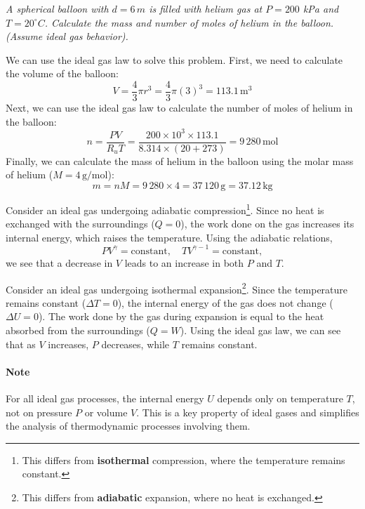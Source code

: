 \documentclass[11pt]{report}
\begin{document}
\begin{example}
    \textit{A spherical balloon with $d = 6\, m$ is filled with helium gas at $P = 200$ kPa and $T = 20^\circ C$. Calculate the mass and number of moles of helium in the balloon. (Assume ideal gas behavior).}

    We can use the ideal gas law to solve this problem. First, we need to calculate the volume of the balloon:
    $$        
    V = \frac{4}{3} \pi r^3 = \frac{4}{3} \pi (3)^3 = 113.1\, \text{m}^3
    $$
    Next, we can use the ideal gas law to calculate the number of moles of helium in the balloon:
    $$
        n = \frac{PV}{R_uT} = \frac{200 \times 10^3 \times 113.1}{8.314 \times (20 + 273)} = 9\,280\, \text{mol}
    $$
    Finally, we can calculate the mass of helium in the balloon using the molar mass of helium ($M = 4\, \text{g/mol}$):
    $$
        m = nM = 9\,280 \times 4  = 37\,120\, \text{g} = 37.12\, \text{kg}
    $$
\end{example}

\begin{example}
    Consider an ideal gas undergoing adiabatic compression\footnote{This differs from \textbf{isothermal} compression, where the temperature remains constant.}. 
    Since no heat is exchanged with the surroundings ($Q=0$), the work done on the gas increases its internal energy, which raises the temperature. 
    Using the adiabatic relations,
    $$
        P V^{\gamma} = \text{constant}, 
        \quad T V^{\gamma - 1} = \text{constant},
    $$
    we see that a decrease in $V$ leads to an increase in both $P$ and $T$.
\end{example}

\begin{example}
    Consider an ideal gas undergoing isothermal expansion\footnote{This differs from \textbf{adiabatic} expansion, where no heat is exchanged.}. 
    Since the temperature remains constant ($\Delta T = 0$), the internal energy of the gas does not change ($\Delta U = 0$). 
    The work done by the gas during expansion is equal to the heat absorbed from the surroundings ($Q = W$). 
    Using the ideal gas law, we can see that as $V$ increases, $P$ decreases, while $T$ remains constant.
    
\end{example}

\paragraph{Note} For all ideal gas processes, the internal energy $U$ depends only on temperature $T$, not on pressure $P$ or volume $V$. This is a key property of ideal gases and simplifies the analysis of thermodynamic processes involving them.
\end{document}
